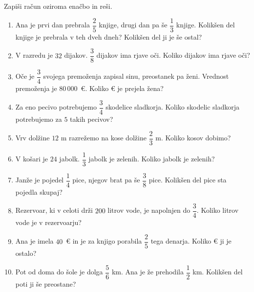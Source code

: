 \documentclass[a4paper,12pt]{letter}
\begin{document}
\begin{naloga}
Zapi\v{s}i ra\v{c}un oziroma ena\v{c}bo in reši.

\begin{enumerate}[1.)]
\item Ana je prvi dan prebrala $\dfrac{2}{5}$ knjige, drugi dan pa \v{s}e $\dfrac{1}{3}$ knjige.
Kolik\v{s}en del knjige je prebrala v teh dveh dneh? Kolik\v{s}en del ji je \v{s}e ostal?
\item V razredu je $32$ dijakov. $\dfrac{3}{8}$ dijakov ima rjave o\v{c}i. Koliko dijakov ima rjave o\v{c}i?
\item O\v{c}e je $\dfrac{3}{4}$ svojega premo\v{z}enja zapisal sinu, preostanek pa \v{z}eni.
Vrednost premo\v{z}enja je $80\,000$~\euro{}. Koliko \euro{} je prejela \v{z}ena?
\item Za eno pecivo potrebujemo $\dfrac{3}{4}$ skodelice sladkorja. Koliko skodelic sladkorja
potrebujemo za $5$ takih pecivov?
\item Vrv dol\v{z}ine $12$ m razre\v{z}emo na kose dol\v{z}ine $\dfrac{2}{3}$ m. Koliko kosov dobimo?
\item V ko\v{s}ari je $24$ jabolk. $\dfrac{1}{3}$ jabolk je zelenih. Koliko jabolk je zelenih?
\item Jan\v{z}e je pojedel $\dfrac{1}{4}$ pice, njegov brat pa \v{s}e $\dfrac{3}{8}$ pice. Kolik\v{s}en del pice sta pojedla skupaj?
\item Rezervoar, ki v celoti dr\v{z}i $200$ litrov vode, je napolnjen do $\dfrac{3}{4}$. Koliko litrov vode je v rezervoarju?
\item Ana je imela $40$~\euro{} in je za knjigo porabila $\dfrac{2}{5}$ tega denarja. Koliko \euro{} ji je ostalo?
\item Pot od doma do \v{s}ole je dolga $\dfrac{5}{6}$ km. Ana je \v{z}e prehodila $\dfrac{1}{2}$ km. Kolik\v{s}en del poti ji \v{s}e preostane?
\end{enumerate}
\end{naloga}
\end{document}
